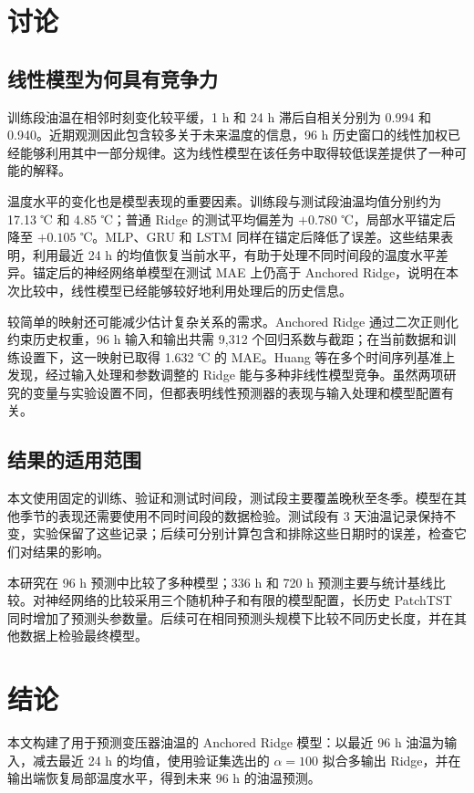 \documentclass[UTF8,a4paper,11pt,fontset=windows]{ctexart}
\begin{document}
\section{讨论}
\subsection{线性模型为何具有竞争力}
训练段油温在相邻时刻变化较平缓，1 h 和 24 h 滞后自相关分别为 0.994 和 0.940。近期观测因此包含较多关于未来温度的信息，96 h 历史窗口的线性加权已经能够利用其中一部分规律。这为线性模型在该任务中取得较低误差提供了一种可能的解释。

温度水平的变化也是模型表现的重要因素。训练段与测试段油温均值分别约为 17.13 ℃ 和 4.85 ℃；普通 Ridge 的测试平均偏差为 $+0.780$ ℃，局部水平锚定后降至 $+0.105$ ℃。MLP、GRU 和 LSTM 同样在锚定后降低了误差。这些结果表明，利用最近 24 h 的均值恢复当前水平，有助于处理不同时间段的温度水平差异。锚定后的神经网络单模型在测试 MAE 上仍高于 Anchored Ridge，说明在本次比较中，线性模型已经能够较好地利用处理后的历史信息。

较简单的映射还可能减少估计复杂关系的需求。Anchored Ridge 通过二次正则化约束历史权重，96 h 输入和输出共需 9,312 个回归系数与截距；在当前数据和训练设置下，这一映射已取得 1.632 ℃ 的 MAE。Huang 等在多个时间序列基准上发现，经过输入处理和参数调整的 Ridge 能与多种非线性模型竞争\cite{huang2026linear}。虽然两项研究的变量与实验设置不同，但都表明线性预测器的表现与输入处理和模型配置有关。

\subsection{结果的适用范围}
本文使用固定的训练、验证和测试时间段，测试段主要覆盖晚秋至冬季。模型在其他季节的表现还需要使用不同时间段的数据检验。测试段有 3 天油温记录保持不变，实验保留了这些记录；后续可分别计算包含和排除这些日期时的误差，检查它们对结果的影响。

本研究在 96 h 预测中比较了多种模型；336 h 和 720 h 预测主要与统计基线比较。对神经网络的比较采用三个随机种子和有限的模型配置，长历史 PatchTST 同时增加了预测头参数量。后续可在相同预测头规模下比较不同历史长度，并在其他数据上检验最终模型。

\section{结论}
本文构建了用于预测变压器油温的 Anchored Ridge 模型：以最近 96 h 油温为输入，减去最近 24 h 的均值，使用验证集选出的 $\alpha=100$ 拟合多输出 Ridge，并在输出端恢复局部温度水平，得到未来 96 h 的油温预测。
\end{document}
